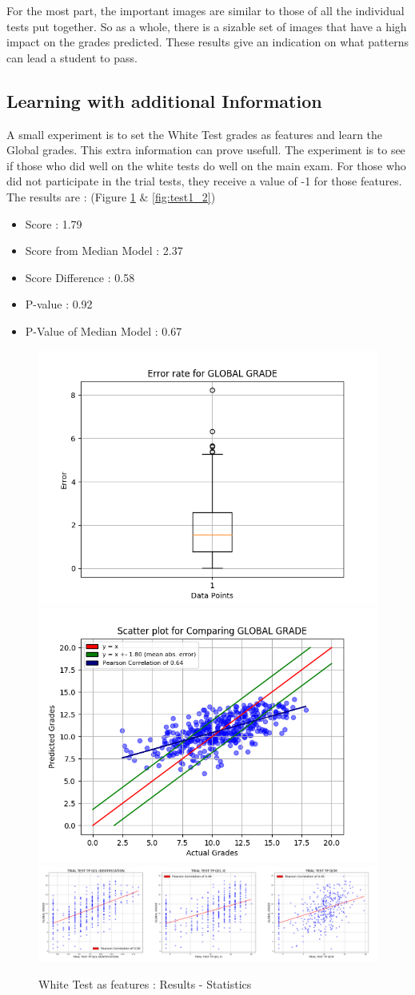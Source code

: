 \documentclass[a4paper,11pt]{report}
\numberwithin{figure}{section} %
\begin{document}
    For the most part, the important images are similar to those of all the individual tests put together.
    So as a whole, there is a sizable set of images that have a high impact on the grades predicted.
    These results give an indication on what patterns can lead a student to pass.

    \subsection{Learning with additional Information}

    A small experiment is to set the White Test grades as features and learn the Global grades.
    This extra information can prove usefull.
    The experiment is to see if those who did well on the white tests do well on the main exam.
    For those who did not participate in the trial tests, they receive a value of -1 for those features.
    The results are : (Figure \ref{fig:test1_1} \& \ref{fig:test1_2})
    \begin{itemize}
        \item[\textbullet] Score : 1.79
        \item[\textbullet] Score from Median Model : 2.37
        \item[\textbullet] Score Difference : 0.58
        \item[\textbullet] P-value : 0.92
        \item[\textbullet] P-Value of Median Model : 0.67
    \end{itemize}
      \begin{figure}[H]
      \centering
      \includegraphics[width=.40\linewidth]{plots/test1_cv_boxplot_GLOBAL_GRADE_2018-05-17_20_39_42.png}
      \includegraphics[width=.40\linewidth]{plots/test1_cv_comp_GLOBAL_GRADE_2018-05-17_20_39_42.png}\\
      \includegraphics[width=.95\linewidth]{plots/test1_var_correlation_GLOBAL_GRADE_2018-05-17_10_12_19.png}
      \caption{White Test as features : Results - Statistics}
      \label{fig:test1_1}
      \end{figure}
\end{document}
